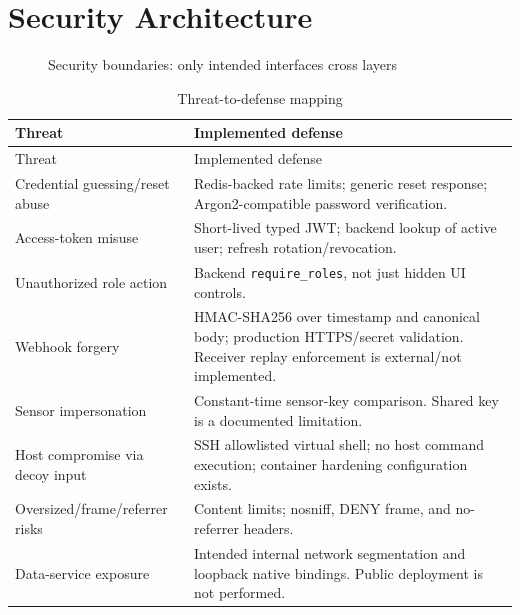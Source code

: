 \documentclass[11pt,oneside]{book}
\begin{document}
\chapter{Security Architecture}
\begin{figure}[h]\centering{}\caption{Security boundaries: only intended interfaces cross layers}\end{figure}
\begin{longtable}{p{45mm}p{100mm}}\caption{Threat-to-defense mapping}\\\toprule Threat & Implemented defense\\\midrule\endfirsthead\toprule Threat & Implemented defense\\\midrule\endhead
Credential guessing/reset abuse & Redis-backed rate limits; generic reset response; Argon2-compatible password verification.\\
Access-token misuse & Short-lived typed JWT; backend lookup of active user; refresh rotation/revocation.\\
Unauthorized role action & Backend \texttt{require\_roles}, not just hidden UI controls.\\
Webhook forgery & HMAC-SHA256 over timestamp and canonical body; production HTTPS/secret validation. Receiver replay enforcement is external/not implemented.\\
Sensor impersonation & Constant-time sensor-key comparison. Shared key is a documented limitation.\\
Host compromise via decoy input & SSH allowlisted virtual shell; no host command execution; container hardening configuration exists.\\
Oversized/frame/referrer risks & Content limits; nosniff, DENY frame, and no-referrer headers.\\
Data-service exposure & Intended internal network segmentation and loopback native bindings. Public deployment is not performed.\\\bottomrule\end{longtable}
\end{document}
